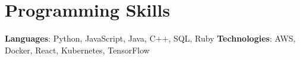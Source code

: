 \section{Programming Skills}
 \resumeSubHeadingListStart
   \item{
     \textbf{Languages}{: Python, JavaScript, Java, C++, SQL, Ruby}
     \hfill
     \textbf{Technologies}{: AWS, Docker, React, Kubernetes, TensorFlow}
   }
 \resumeSubHeadingListEnd